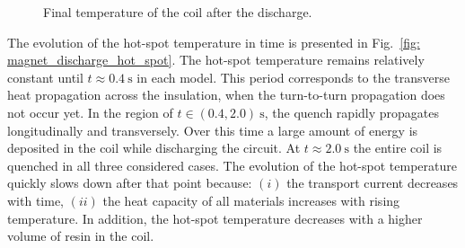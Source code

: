\begin{figure}[H]
    \centering
    \caption{Final temperature of the coil after the discharge.}
    \label{fig: magnet_discharge_final_temperature}
\end{figure}

The evolution of the hot-spot temperature in time is presented in Fig.~\ref{fig: magnet_discharge_hot_spot}. The hot-spot temperature remains relatively constant until $t \approx 0.4~\text{s}$ in each model. This period corresponds to the transverse heat propagation across the insulation, when the turn-to-turn propagation does not occur yet. In the region of $t \in (0.4, 2.0)~\text{s}$, the quench rapidly propagates longitudinally and transversely. Over this time a large amount of energy is deposited in the coil while discharging the circuit. At $t \approx 2.0~\text{s}$ the entire coil is quenched in all three considered cases. The evolution of the hot-spot temperature quickly slows down after that point because: $(i)$ the transport current decreases with time, $(ii)$ the heat capacity of all materials increases with rising temperature. In addition, the hot-spot temperature decreases with a higher volume of resin in the coil. 

